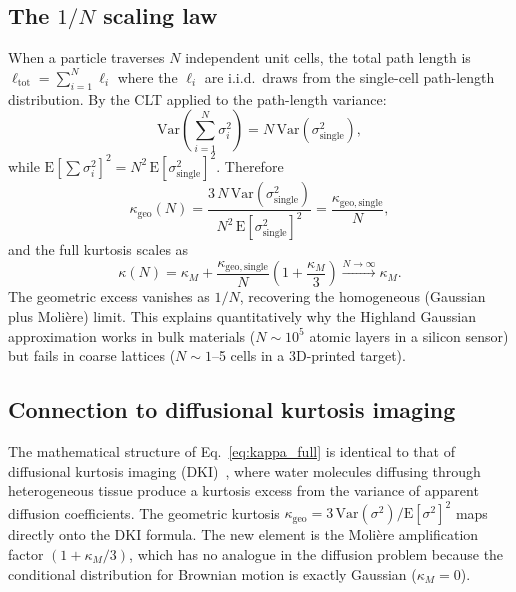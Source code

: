 \documentclass[final,5p,times,twocolumn]{elsarticle}
\begin{document}
\subsection{The \texorpdfstring{$1/N$}{1/N} scaling law}
\label{sec:Nscaling}

When a particle traverses $N$ independent unit cells, the total path length is $\ell_{\mathrm{tot}} = \sum_{i=1}^N \ell_i$ where the $\ell_i$ are i.i.d.\ draws from the single-cell path-length distribution.  By the CLT applied to the path-length variance:
\begin{equation}
  \mathrm{Var}\!\left(\sum_{i=1}^N \sigma_i^2\right) = N\,\mathrm{Var}(\sigma_{\mathrm{single}}^2),
  \label{eq:var_sum}
\end{equation}
while $\mathrm{E}[\sum\sigma_i^2]^2 = N^2\,\mathrm{E}[\sigma_{\mathrm{single}}^2]^2$.  Therefore
\begin{equation}
  \kappa_{\mathrm{geo}}(N) = \frac{3\,N\,\mathrm{Var}(\sigma_{\mathrm{single}}^2)}{N^2\,\mathrm{E}[\sigma_{\mathrm{single}}^2]^2} = \frac{\kappa_{\mathrm{geo,single}}}{N},
  \label{eq:1overN}
\end{equation}
and the full kurtosis scales as
\begin{equation}
  \kappa(N) = \kappa_M + \frac{\kappa_{\mathrm{geo,single}}}{N}\!\left(1+\frac{\kappa_M}{3}\right) \xrightarrow{N\to\infty}\kappa_M.
  \label{eq:kappaN}
\end{equation}
The geometric excess vanishes as $1/N$, recovering the homogeneous (Gaussian plus Moli\`{e}re) limit.  This explains quantitatively why the Highland Gaussian approximation works in bulk materials ($N\sim 10^5$ atomic layers in a silicon sensor) but fails in coarse lattices ($N\sim 1$--5 cells in a 3D-printed target).

\subsection{Connection to diffusional kurtosis imaging}
\label{sec:DKI}

The mathematical structure of Eq.~\eqref{eq:kappa_full} is identical to that of diffusional kurtosis imaging (DKI)~\cite{Jensen2005}, where water molecules diffusing through heterogeneous tissue produce a kurtosis excess from the variance of apparent diffusion coefficients.  The geometric kurtosis $\kappa_{\mathrm{geo}} = 3\,\mathrm{Var}(\sigma^2)/\mathrm{E}[\sigma^2]^2$ maps directly onto the DKI formula.  The new element is the Moli\`{e}re amplification factor $(1+\kappa_M/3)$, which has no analogue in the diffusion problem because the conditional distribution for Brownian motion is exactly Gaussian ($\kappa_M=0$).
\end{document}

